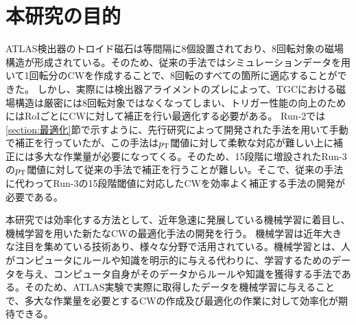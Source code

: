 \section{本研究の目的}
ATLAS検出器のトロイド磁石は等間隔に8個設置されており、8回転対象の磁場構造が形成されている。そのため、従来の手法ではシミュレーションデータを用いて1回転分のCWを作成することで、8回転のすべての箇所に適応することができた。
しかし、実際には検出器アライメントのズレによって、TGCにおける磁場構造は厳密には8回転対象ではなくなってしまい、トリガー性能の向上のためにはRoIごとにCWに対して補正を行い最適化する必要がある。
Run-2では\ref{section:最適化}節で示すように、先行研究によって開発された手法を用いて手動で補正を行っていたが、この手法は$p_{\rm{T}}$閾値に対して柔軟な対応が難しい上に補正には多大な作業量が必要になってくる。そのため、15段階に増設されたRun-3の$p_{\rm{T}}$閾値に対して従来の手法で補正を行うことが難しい。そこで、従来の手法に代わってRun-3の15段階閾値に対応したCWを効率よく補正する手法の開発が必要である。

本研究では効率化する方法として、近年急速に発展している機械学習に着目し、機械学習を用いた新たなCWの最適化手法の開発を行う。
機械学習は近年大きな注目を集めている技術あり、様々な分野で活用されている。機械学習とは、人がコンピュータにルールや知識を明示的に与える代わりに、学習するためのデータを与え、コンピュータ自身がそのデータからルールや知識を獲得する手法である。そのため、ATLAS実験で実際に取得したデータを機械学習に与えることで、多大な作業量を必要とするCWの作成及び最適化の作業に対して効率化が期待できる。













